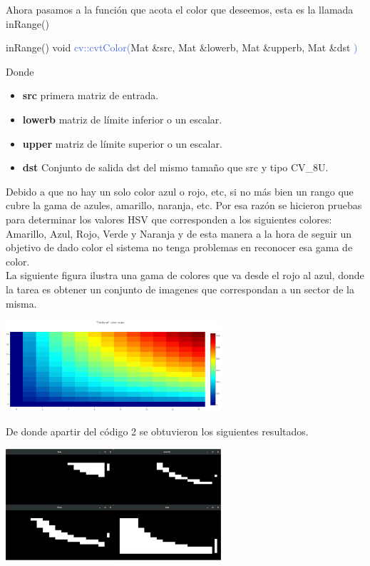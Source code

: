 Ahora pasamos a la función que acota el color que deseemos, esta es la llamada inRange()
\begin{example}[label={ex:serie}]{inRange()}
	\textcolor{Mulberry}{void} \textcolor{RoyalBlue}{cv::cvtColor(}\textcolor{BurntOrange}{Mat}
	\textcolor{Mulberry}{\&}\textcolor{Bittersweet}{src}, \textcolor{BurntOrange}{Mat} \textcolor{Mulberry}{\&}\textcolor{Bittersweet}{lowerb},
	\textcolor{BurntOrange}{Mat} \textcolor{Mulberry}{\&}\textcolor{Bittersweet}{upperb},
	\textcolor{BurntOrange}{Mat} \textcolor{Mulberry}{\&}\textcolor{Bittersweet}{dst}
	\textcolor{RoyalBlue}{)}
\end{example}
Donde
\begin{itemize}
	\item \textbf{src} primera matriz de entrada.
	\item \textbf{lowerb} matriz de límite inferior o un escalar.
	\item \textbf{upper}  matriz de límite superior o un escalar.
	\item \textbf{dst} Conjunto de salida dst del mismo tamaño que src y tipo CV\_8U.
\end{itemize}
Debido a que no hay un solo color azul o rojo, etc, si no más bien un rango que cubre
la gama de azules, amarillo, naranja, etc. Por esa razón se hicieron pruebas para
determinar los valores HSV que corresponden a los siguientes colores: Amarillo, Azul,
Rojo, Verde y Naranja y de esta manera a la hora de seguir un objetivo de dado color
el sistema no tenga problemas en reconocer esa gama de color.\\
La siguiente figura ilustra una gama de colores que va desde el rojo al azul, donde la
tarea es obtener un conjunto de imagenes que correspondan a un sector de la misma.
\begin{center}
	\includegraphics[width=0.6\textwidth]{Contenido/Cuerpo/Capitulo4/Fig4.eps}
	\label{Fig6}
\end{center}
De donde apartir del código 2 se obtuvieron los siguientes resultados.
\begin{center}
	\includegraphics[width=0.6\textwidth]{Contenido/Cuerpo/Capitulo4/Fig5.eps}
	\label{Fig6}
\end{center}
